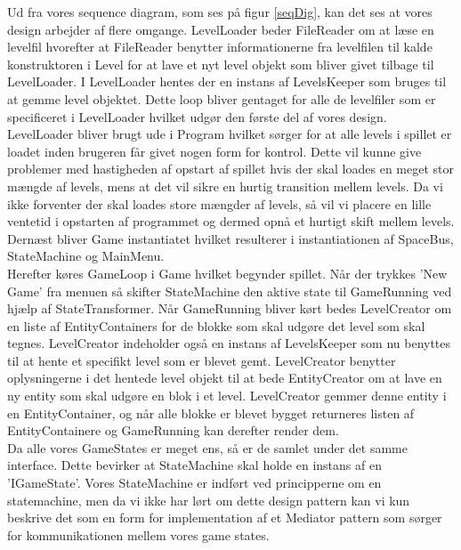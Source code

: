 Ud fra vores sequence diagram, som ses på figur \ref{seqDig}, kan det ses at vores design arbejder af flere omgange. LevelLoader beder FileReader om at læse en levelfil hvorefter at FileReader benytter informationerne fra levelfilen til kalde konstruktoren i Level for at lave et nyt level objekt som bliver givet tilbage til LevelLoader. I LevelLoader hentes der en instans af LevelsKeeper som bruges til at gemme level objektet. Dette loop bliver gentaget for alle de levelfiler som er specificeret i LevelLoader hvilket udgør den første del af vores design. LevelLoader bliver brugt ude i Program hvilket sørger for at alle levels i spillet er loadet inden brugeren får givet nogen form for kontrol. Dette vil kunne give problemer med hastigheden af opstart af spillet hvis der skal loades en meget stor mængde af levels, mens at det vil sikre en hurtig transition mellem levels. Da vi ikke forventer der skal loades store mængder af levels, så vil vi placere en lille ventetid i opstarten af programmet og dermed opnå et hurtigt skift mellem levels. \\
Dernæst bliver Game instantiatet hvilket resulterer i instantiationen af SpaceBus, StateMachine og MainMenu.\\
Herefter køres GameLoop i Game hvilket begynder spillet. Når der trykkes 'New Game' fra menuen så skifter StateMachine den aktive state til GameRunning ved hjælp af StateTransformer. Når GameRunning bliver kørt bedes LevelCreator om en liste af EntityContainers for de blokke som skal udgøre det level som skal tegnes. LevelCreator indeholder også en instans af LevelsKeeper som nu benyttes til at hente et specifikt level som er blevet gemt. LevelCreator benytter oplysningerne i det hentede level objekt til at bede EntityCreator om at lave en ny entity som skal udgøre en blok i et level. LevelCreator gemmer denne entity i en EntityContainer, og når alle blokke er blevet bygget returneres listen af EntityContainere og GameRunning kan derefter render dem.\\
Da alle vores GameStates er meget ens, så er de samlet under det samme interface. Dette bevirker at StateMachine skal holde en instans af en 'IGameState'. Vores StateMachine er indført ved principperne om en statemachine, men da vi ikke har lørt om dette design pattern kan vi kun beskrive det som en form for implementation af et Mediator pattern som sørger for kommunikationen mellem vores game states.\\

